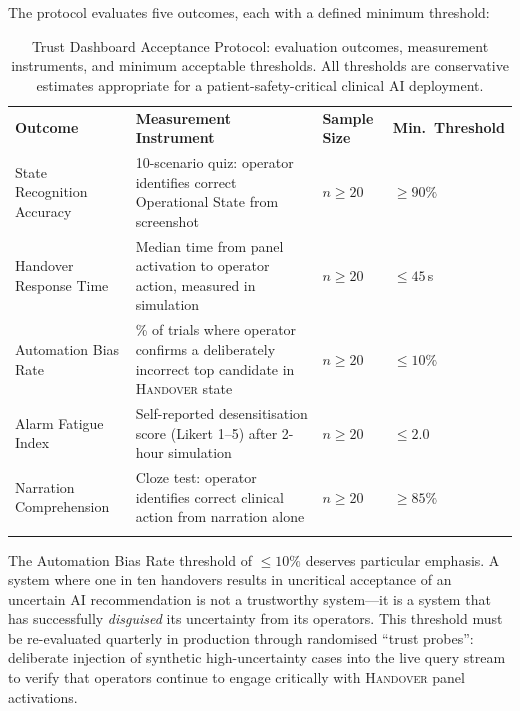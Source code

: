 The protocol evaluates five outcomes, each with a defined
minimum threshold:

\begin{table}[ht]
\centering
\caption{Trust Dashboard Acceptance Protocol: evaluation outcomes,
  measurement instruments, and minimum acceptable thresholds.
  All thresholds are conservative estimates appropriate for a
  patient-safety-critical clinical AI deployment.}
\label{tab:dashboard-acceptance}
\begin{tabular}{p{3.4cm}p{3.8cm}p{2.0cm}p{2.4cm}}
\hline\noalign{\smallskip}
\textbf{Outcome}
  & \textbf{Measurement Instrument}
  & \textbf{Sample Size}
  & \textbf{Min.\ Threshold} \\
\noalign{\smallskip}\svhline\noalign{\smallskip}
State Recognition Accuracy
  & 10-scenario quiz: operator identifies
    correct Operational State from screenshot
  & $n \geq 20$
  & $\geq 90\%$ \\[4pt]
Handover Response Time
  & Median time from panel activation to
    operator action, measured in simulation
  & $n \geq 20$
  & $\leq 45$\,s \\[4pt]
Automation Bias Rate
  & \% of trials where operator confirms
    a deliberately incorrect top candidate
    in \textsc{Handover} state
  & $n \geq 20$
  & $\leq 10\%$ \\[4pt]
Alarm Fatigue Index
  & Self-reported desensitisation score
    (Likert 1--5) after 2-hour simulation
  & $n \geq 20$
  & $\leq 2.0$ \\[4pt]
Narration Comprehension
  & Cloze test: operator identifies correct
    clinical action from narration alone
  & $n \geq 20$
  & $\geq 85\%$ \\
\noalign{\smallskip}\hline\noalign{\smallskip}
\end{tabular}
\end{table}

The Automation Bias Rate threshold of $\leq 10\%$ deserves
particular emphasis.
A system where one in ten handovers results in uncritical
acceptance of an uncertain AI recommendation is not a
trustworthy system---it is a system that has successfully
\emph{disguised} its uncertainty from its operators.
This threshold must be re-evaluated quarterly in production
through randomised ``trust probes'': deliberate injection of
synthetic high-uncertainty cases into the live query stream to
verify that operators continue to engage critically with
\textsc{Handover} panel activations.

